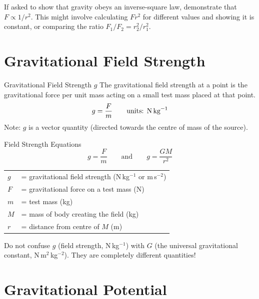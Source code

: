 \begin{tipbox}
If asked to show that gravity obeys an inverse-square law, demonstrate that
$F \propto 1/r^2$. This might involve calculating $Fr^2$ for different values and
showing it is constant, or comparing the ratio $F_1/F_2 = r_2^2/r_1^2$.
\end{tipbox}

\section{Gravitational Field Strength}

\begin{defnbox}{Gravitational Field Strength $g$}
The gravitational field strength at a point is the gravitational force per unit mass
acting on a small test mass placed at that point.
\[
  g = \frac{F}{m} \qquad \text{units: N\,kg}^{-1}
\]
Note: $g$ is a vector quantity (directed towards the centre of mass of the source).
\end{defnbox}

\begin{formulabox}{Field Strength Equations}
\begin{equation}
  g = \frac{F}{m} \qquad \text{and} \qquad g = \frac{GM}{r^2}
\end{equation}
\begin{tabular}{ll}
$g$ & = gravitational field strength (N\,kg$^{-1}$ or m\,s$^{-2}$) \\
$F$ & = gravitational force on a test mass (N) \\
$m$ & = test mass (kg) \\
$M$ & = mass of body creating the field (kg) \\
$r$ & = distance from centre of $M$ (m) \\
\end{tabular}
\end{formulabox}

\begin{warnbox}
Do not confuse $g$ (field strength, N\,kg$^{-1}$) with $G$ (the universal
gravitational constant, N\,m$^2$\,kg$^{-2}$). They are completely different
quantities!
\end{warnbox}

\section{Gravitational Potential}

